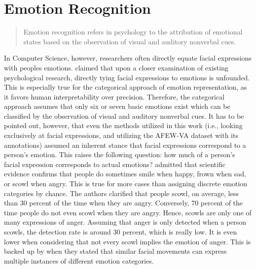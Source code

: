 
\section{Emotion Recognition}

\begin{quote}
    Emotion recognition refers in psychology to the attribution of emotional states based on the observation of visual and auditory nonverbal cues. \citep[~p. 3935]{Baenziger:2014:MeasuringERAbility}
\end{quote}
In Computer Science, however, researchers often directly equate facial expressions with peoples emotions. \citet{Barrett:2019:EmotionalFromFacialMovements} claimed that upon a closer examination of existing psychological research, directly tying facial expressions to emotions is unfounded. This is especially true for the categorical approach of emotion representation, as it favors human interpretability over precision. Therefore, the categorical approach assumes that only six or seven basic emotions exist which can be classified by the observation of visual and auditory nonverbal cues.
\newline\newline
It has to be pointed out, however, that even the methods utilized in this work (i.e., looking exclusively at facial expressions, and utilizing the AFEW-VA dataset with its annotations) assumed an inherent stance that facial expressions correspond to a person’s emotion. This raises the following question: how much of a person's facial expression corresponds to actual emotions?
\newline\newline
\citet{Barrett:2019:EmotionalFromFacialMovements} admitted that scientific evidence confirms that people do sometimes smile when happy, frown when sad, or scowl when angry. This is true for more cases than assigning discrete emotion categories by chance. The authors clarified that people scowl, on average, less than 30 percent of the time when they are angry. Conversely, 70 percent of the time people do not even scowl when they are angry. Hence, scowls are only one of many expressions of anger. Assuming that anger is only detected when a person scowls, the detection rate is around 30 percent, which is really low. It is even lower when considering that not every scowl implies the emotion of anger. This is backed up by \citet{Barrett:2019:EmotionalFromFacialMovements} when they stated that similar facial movements can express multiple instances of different emotion categories.
